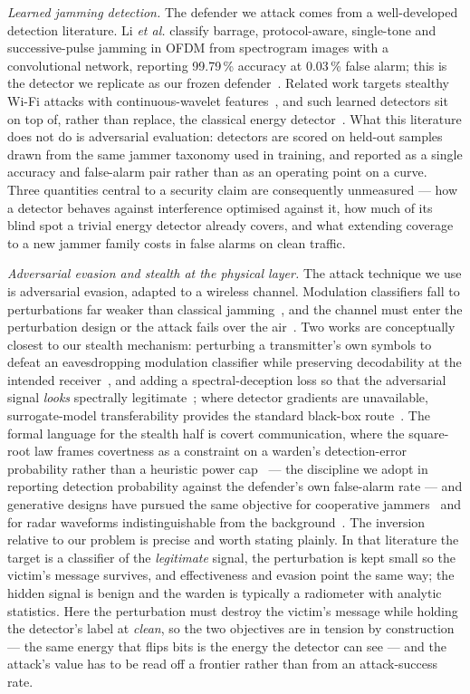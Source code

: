 \textit{Learned jamming detection.}
The defender we attack comes from a well-developed detection literature.
Li \emph{et al.} classify barrage, protocol-aware, single-tone and successive-pulse jamming in OFDM from spectrogram images with a convolutional network, reporting 99.79\,\% accuracy at 0.03\,\% false alarm; this is the detector we replicate as our frozen defender~\cite{li2022jamming_ofdm}.
Related work targets stealthy Wi-Fi attacks with continuous-wavelet features~\cite{zhang2023detection}, and such learned detectors sit on top of, rather than replace, the classical energy detector~\cite{urkowitz1967energy}.
What this literature does not do is adversarial evaluation: detectors are scored on held-out samples drawn from the same jammer taxonomy used in training, and reported as a single accuracy and false-alarm pair rather than as an operating point on a curve.
Three quantities central to a security claim are consequently unmeasured --- how a detector behaves against interference optimised against it, how much of its blind spot a trivial energy detector already covers, and what extending coverage to a new jammer family costs in false alarms on clean traffic.

\textit{Adversarial evasion and stealth at the physical layer.}
The attack technique we use is adversarial evasion, adapted to a wireless channel.
Modulation classifiers fall to perturbations far weaker than classical jamming~\cite{sadeghi2019adversarial}, and the channel must enter the perturbation design or the attack fails over the air~\cite{kim2022channel}.
Two works are conceptually closest to our stealth mechanism: perturbing a transmitter's own symbols to defeat an eavesdropping modulation classifier while preserving decodability at the intended receiver~\cite{hameed2021offense}, and adding a spectral-deception loss so that the adversarial signal \emph{looks} spectrally legitimate~\cite{delvecchio2020spectral}; where detector gradients are unavailable, surrogate-model transferability provides the standard black-box route~\cite{papernot2017practical}.
The formal language for the stealth half is covert communication, where the square-root law frames covertness as a constraint on a warden's detection-error probability rather than a heuristic power cap~\cite{bash2013limits} --- the discipline we adopt in reporting detection probability against the defender's own false-alarm rate --- and generative designs have pursued the same objective for cooperative jammers~\cite{wen2025generative} and for radar waveforms indistinguishable from the background~\cite{ziemann2025lpd}.
The inversion relative to our problem is precise and worth stating plainly.
In that literature the target is a classifier of the \emph{legitimate} signal, the perturbation is kept small so the victim's message survives, and effectiveness and evasion point the same way; the hidden signal is benign and the warden is typically a radiometer with analytic statistics.
Here the perturbation must destroy the victim's message while holding the detector's label at \emph{clean}, so the two objectives are in tension by construction --- the same energy that flips bits is the energy the detector can see --- and the attack's value has to be read off a frontier rather than from an attack-success rate.


